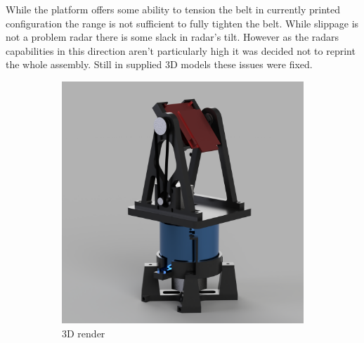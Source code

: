 While the platform offers some ability to tension the belt in currently printed configuration the range is not sufficient to fully tighten the belt.
While slippage is not a problem radar there is some slack in radar's tilt.
However as the radars capabilities in this direction aren't particularly high it was decided not to reprint the whole assembly.
Still in supplied 3D models these issues were fixed.

\begin{figure}[h!]
  \centering
  \begin{subfigure}[b]{0.45\textwidth}
    \centering
    \includegraphics[width=\textwidth]{../img/whole_assembly_2.png}
    \caption{3D render}
  \end{subfigure}
  \hspace{0.05\textwidth} %
  \begin{subfigure}[b]{0.45\textwidth}
    \centering

\end{subfigure}
\end{figure}
